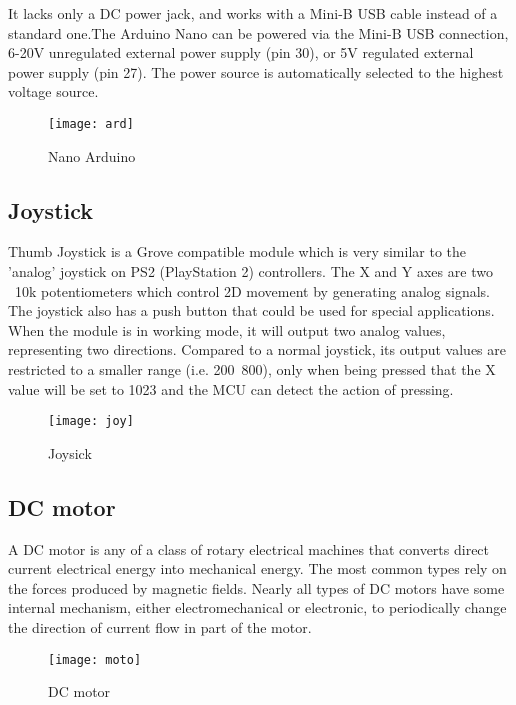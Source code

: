 \documentclass[12pt,a4paper]{report}
\begin{document}
It lacks only a DC power jack, and works with a Mini-B USB cable instead of a standard one.The Arduino Nano can be powered via the Mini-B USB connection, 6-20V unregulated external power supply (pin 30), or 5V regulated external power supply (pin 27). The power source is automatically selected to the highest voltage source.

\begin{figure}[h!]
\centering
\texttt{[image: ard]}
\caption{Nano Arduino}
\label{circuit}
\end{figure}

\subsection{Joystick}


\hspace*{1cm} Thumb Joystick is a Grove compatible module which is very similar to the 'analog' joystick on PS2 (PlayStation 2) controllers. The X and Y axes are two ~10k potentiometers which control 2D movement by generating analog signals. The joystick also has a push button that could be used for special applications. When the module is in working mode, it will output two analog values, representing two directions. Compared to a normal joystick, its output values are restricted to a smaller range (i.e. 200~800), only when being pressed that the X value will be set to 1023 and the MCU can detect the action of pressing.

\begin{figure}[h!]
\centering
\texttt{[image: joy]}
\caption{Joysick}
\label{circuit}
\end{figure}
\newpage
\subsection{DC motor}

\hspace*{1cm} A DC motor is any of a class of rotary electrical machines that converts direct current electrical energy into mechanical energy. The most common types rely on the forces produced by magnetic fields. Nearly all types of DC motors have some internal mechanism, either electromechanical or electronic, to periodically change the direction of current flow in part of the motor.

\begin{figure}[h!]
\centering
\texttt{[image: moto]}
\caption{DC motor}
\label{circuit}
\end{figure}
\newpage
\end{document}
